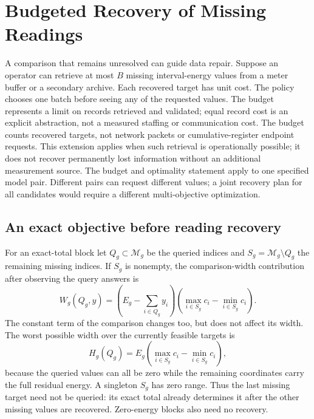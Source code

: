 \documentclass[12pt]{article}
\newcommand{\M}{\mathcal{M}}
\begin{document}
\section{Budgeted Recovery of Missing Readings}
A comparison that remains unresolved can guide data repair.
Suppose an operator can retrieve at most $B$ missing interval-energy values
from a meter buffer or a secondary archive. Each recovered target has unit
cost. The policy chooses one batch before seeing any of the requested
values. The budget represents a limit on records retrieved and validated;
equal record cost is an explicit abstraction, not a measured staffing or
communication cost. The budget counts recovered targets, not network packets or
cumulative-register endpoint requests. This extension applies when such
retrieval is operationally possible; it does not recover permanently lost
information without an additional measurement source. The budget and
optimality statement apply to one specified model pair. Different pairs
can request different values; a joint recovery plan for all candidates
would require a different multi-objective optimization.

\subsection{An exact objective before reading recovery}
For an exact-total block let $Q_g\subset\M_g$ be the queried indices and
$S_g=\M_g\setminus Q_g$ the remaining missing indices. If $S_g$ is nonempty,
the comparison-width contribution after observing the query answers is
\begin{equation}
 W_g(Q_g,y)=\left(E_g-\sum_{i\in Q_g}y_i\right)
 \left(\max_{i\in S_g}c_i-\min_{i\in S_g}c_i\right).
 \label{eq:querywidth}
\end{equation}
The constant term of the comparison changes too, but does not affect its
width. The worst possible width over the currently feasible targets is
\begin{equation}
 H_g(Q_g)=E_g\left(\max_{i\in S_g}c_i-\min_{i\in S_g}c_i\right),
 \label{eq:worstquery}
\end{equation}
because the queried values can all be zero while the remaining coordinates
carry the full residual energy. A singleton $S_g$ has zero range. Thus the
last missing target need not be queried: its exact total already determines
it after the other missing values are recovered. Zero-energy blocks also
need no recovery.
\end{document}
